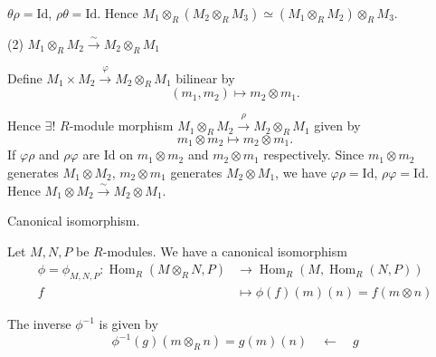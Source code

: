 \documentclass[11pt, a4paper]{report}
\begin{document}
\begin{proposition}
$\theta \rho = \mathrm{Id}$, $\rho \theta = \mathrm{Id}$. Hence $M_{1} \otimes_{R} (M_{2} \otimes_{R} M_{3}) \simeq (M_{1} \otimes_{R} M_{2}) \otimes_{R} M_{3}$.

(2) $M_{1} \otimes_{R} M_{2} \xrightarrow{\sim} M_{2} \otimes_{R} M_{1}$

Define $M_{1} \times M_{2} \xrightarrow{\varphi} M_{2} \otimes_{R} M_{1}$ bilinear by
\[
(m_{1}, m_{2}) \mapsto m_{2} \otimes m_{1}.
\]

Hence $\exists!$ $R$-module morphism $M_{1} \otimes_{R} M_{2} \xrightarrow{\rho} M_{2} \otimes_{R} M_{1}$ given by
\[
m_{1} \otimes m_{2} \mapsto m_{2} \otimes m_{1}.
\]
If $\varphi \rho$ and $\rho \varphi$ are $\mathrm{Id}$ on $m_{1} \otimes m_{2}$ and $m_{2} \otimes m_{1}$ respectively. Since $m_{1} \otimes m_{2}$ generates $M_{1} \otimes M_{2}$, $m_{2} \otimes m_{1}$ generates $M_{2} \otimes M_{1}$, we have $\varphi \rho = \mathrm{Id}$, $\rho \varphi = \mathrm{Id}$. Hence $M_{1} \otimes M_{2} \xrightarrow{\sim} M_{2} \otimes M_{1}$.

\end{proposition}

\begin{theorem}
Canonical isomorphism.

Let $M, N, P$ be $R$-modules. We have a canonical isomorphism
\[
\begin{aligned}
\phi = \phi_{M, N, P}: \operatorname{Hom}_{R}\left(M \otimes_{R} N, P\right) & \longrightarrow \operatorname{Hom}_{R}\left(M, \operatorname{Hom}_{R}(N, P)\right) \\
f & \longmapsto \phi(f)(m)(n) = f(m \otimes n)
\end{aligned}
\]

The inverse $\phi^{-1}$ is given by
\[
\phi^{-1}(g)(m \otimes_{R} n) = g(m)(n) \quad \longleftarrow \quad g
\]
\end{theorem}
\end{document}
